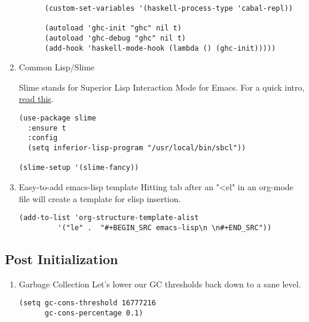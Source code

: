 \documentclass[11pt]{article}
\begin{document}
\begin{enumerate}
\begin{verbatim}
      (custom-set-variables '(haskell-process-type 'cabal-repl))

      (autoload 'ghc-init "ghc" nil t)
      (autoload 'ghc-debug "ghc" nil t)
      (add-hook 'haskell-mode-hook (lambda () (ghc-init)))))
\end{verbatim}

\item Common Lisp/Slime
\label{sec:orga71cdcf}

Slime stands for Superior Lisp Interaction Mode for Emacs. For a quick intro, \href{http://gigamonkeys.com/book/lather-rinse-repeat-a-tour-of-the-repl.html}{read this}.
\begin{verbatim}
(use-package slime
  :ensure t
  :config
  (setq inferior-lisp-program "/usr/local/bin/sbcl"))

(slime-setup '(slime-fancy))
\end{verbatim}

\item Easy-to-add emacs-lisp template
\label{sec:orgceb8524}
Hitting tab after an "<el" in an org-mode file will create a template for elisp insertion.
\begin{verbatim}
(add-to-list 'org-structure-template-alist
	     '("le" .  "#+BEGIN_SRC emacs-lisp\n \n#+END_SRC"))
\end{verbatim}
\end{enumerate}

\subsection{Post Initialization}
\label{sec:orga143ee0}
\begin{enumerate}
\item Garbage Collection
\label{sec:orgcdcfa17}
Let's lower our GC thresholds back down to a sane level.

\begin{verbatim}
(setq gc-cons-threshold 16777216
      gc-cons-percentage 0.1)
\end{verbatim}
\end{enumerate}
\end{document}
